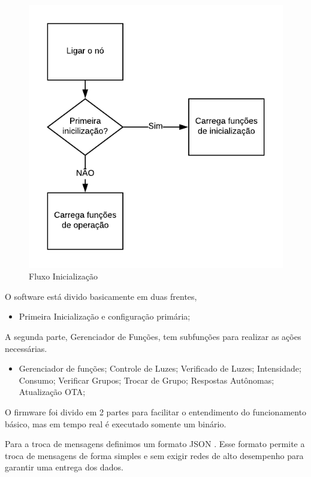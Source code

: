 \documentclass[openright]{normas-utf-tex} %
\begin{document}
\begin{figure}[!htb]
     \centering
     \includegraphics[scale=1]{Primeira_Inicializacao.png}
     \caption{Fluxo Inicialização}
     \label{}
\end{figure}

O software está divido basicamente em duas frentes,

\begin{itemize}
    \item Primeira Inicialização e configuração primária;
\end{itemize}
A segunda parte, Gerenciador de Funções, tem subfunções para realizar as ações necessárias.
\begin{itemize}
    \item Gerenciador de funções;
    \subitem Controle de Luzes;
    \subitem Verificado de Luzes;
    \subitem Intensidade;
    \subitem Consumo;
    \subitem Verificar Grupos;
    \subitem Trocar de Grupo;
    \subitem Respostas Autônomas;
    \subitem Atualização OTA;
\end{itemize}

O firmware foi divido em 2 partes para facilitar o entendimento do funcionamento básico, mas em tempo real é executado somente um binário.

Para a troca de mensagens definimos um formato JSON \cite{json-devmedia}. Esse formato permite a troca de mensagens de forma simples e sem exigir redes de alto desempenho para garantir uma entrega dos dados.
\end{document}
